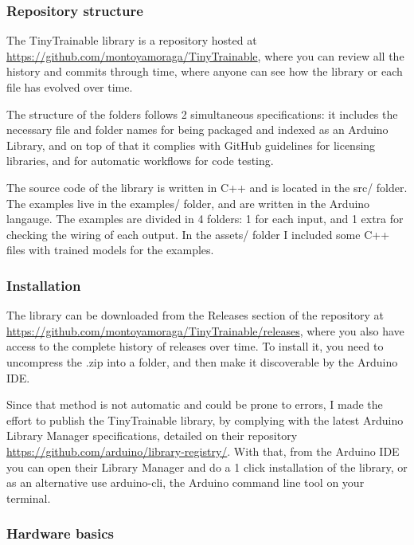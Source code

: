 \subsubsection{Repository structure}

The TinyTrainable library is a repository hosted at \url{https://github.com/montoyamoraga/TinyTrainable}, where you can review all the history and commits through time, where anyone can see how the library or each file has evolved over time.

The structure of the folders follows 2 simultaneous specifications: it includes the necessary file and folder names for being packaged and indexed as an Arduino Library, and on top of that it complies with GitHub guidelines for licensing libraries, and for automatic workflows for code testing.

The source code of the library is written in C++ and is located in the src/ folder. The examples live in the examples/ folder, and are written in the Arduino langauge. The examples are divided in 4 folders: 1 for each input, and 1 extra for checking the wiring of each output. In the assets/ folder I included some C++ files with trained models for the examples.

\subsubsection{Installation}

The library can be downloaded from the Releases section of the repository at  \url{https://github.com/montoyamoraga/TinyTrainable/releases}, where you also have access to the complete history of releases over time. To install it, you need to uncompress the .zip into a folder, and then make it discoverable by the Arduino IDE.

Since that method is not automatic and could be prone to errors, I made the effort to publish the TinyTrainable library, by complying with the latest Arduino Library Manager specifications, detailed on their repository \url{https://github.com/arduino/library-registry/}. With that, from the Arduino IDE you can open their Library Manager and do a 1 click installation of the library, or as an alternative use arduino-cli, the Arduino command line tool on your terminal.

\subsubsection{Hardware basics}

